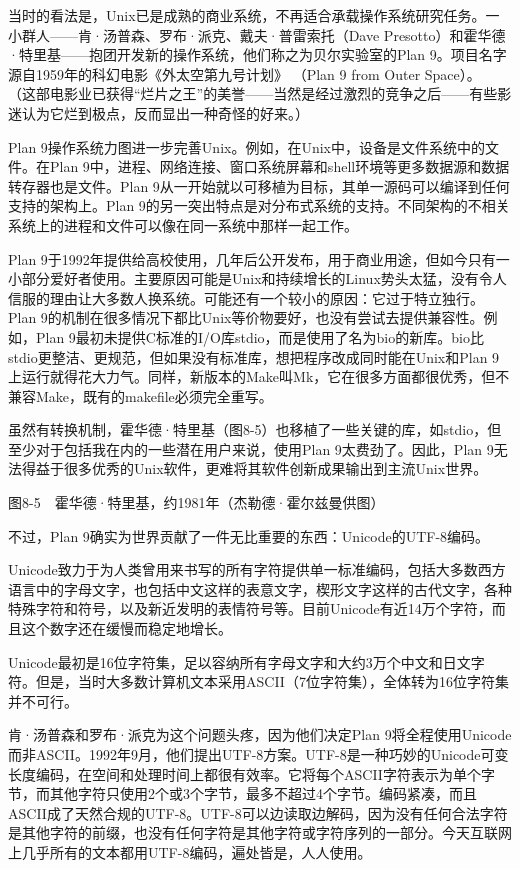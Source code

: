 \documentclass[a4paper,12pt,UTF8,twoside]{ctexbook}
\begin{document}
当时的看法是，Unix已是成熟的商业系统，不再适合承载操作系统研究任务。一小群人——肯·汤普森、罗布·派克、戴夫·普雷索托（Dave Presotto）和霍华德·特里基——抱团开发新的操作系统，他们称之为贝尔实验室的Plan 9。项目名字源自1959年的科幻电影《外太空第九号计划》 （Plan 9 from Outer Space）。 （这部电影业已获得“烂片之王”的美誉——当然是经过激烈的竞争之后——有些影迷认为它烂到极点，反而显出一种奇怪的好来。）

Plan 9操作系统力图进一步完善Unix。例如，在Unix中，设备是文件系统中的文件。在Plan 9中，进程、网络连接、窗口系统屏幕和shell环境等更多数据源和数据转存器也是文件。Plan 9从一开始就以可移植为目标，其单一源码可以编译到任何支持的架构上。Plan 9的另一突出特点是对分布式系统的支持。不同架构的不相关系统上的进程和文件可以像在同一系统中那样一起工作。

Plan 9于1992年提供给高校使用，几年后公开发布，用于商业用途，但如今只有一小部分爱好者使用。主要原因可能是Unix和持续增长的Linux势头太猛，没有令人信服的理由让大多数人换系统。可能还有一个较小的原因：它过于特立独行。Plan 9的机制在很多情况下都比Unix等价物要好，也没有尝试去提供兼容性。例如，Plan 9最初未提供C标准的I/O库stdio，而是使用了名为bio的新库。bio比stdio更整洁、更规范，但如果没有标准库，想把程序改成同时能在Unix和Plan 9上运行就得花大力气。同样，新版本的Make叫Mk，它在很多方面都很优秀，但不兼容Make，既有的makefile必须完全重写。

虽然有转换机制，霍华德·特里基（图8-5）也移植了一些关键的库，如stdio，但至少对于包括我在内的一些潜在用户来说，使用Plan 9太费劲了。因此，Plan 9无法得益于很多优秀的Unix软件，更难将其软件创新成果输出到主流Unix世界。



图8-5　霍华德·特里基，约1981年（杰勒德·霍尔兹曼供图）

不过，Plan 9确实为世界贡献了一件无比重要的东西：Unicode的UTF-8编码。

Unicode致力于为人类曾用来书写的所有字符提供单一标准编码，包括大多数西方语言中的字母文字，也包括中文这样的表意文字，楔形文字这样的古代文字，各种特殊字符和符号，以及新近发明的表情符号等。目前Unicode有近14万个字符，而且这个数字还在缓慢而稳定地增长。

Unicode最初是16位字符集，足以容纳所有字母文字和大约3万个中文和日文字符。但是，当时大多数计算机文本采用ASCII（7位字符集），全体转为16位字符集并不可行。

肯·汤普森和罗布·派克为这个问题头疼，因为他们决定Plan 9将全程使用Unicode而非ASCII。1992年9月，他们提出UTF-8方案。UTF-8是一种巧妙的Unicode可变长度编码，在空间和处理时间上都很有效率。它将每个ASCII字符表示为单个字节，而其他字符只使用2个或3个字节，最多不超过4个字节。编码紧凑，而且ASCII成了天然合规的UTF-8。UTF-8可以边读取边解码，因为没有任何合法字符是其他字符的前缀，也没有任何字符是其他字符或字符序列的一部分。今天互联网上几乎所有的文本都用UTF-8编码，遍处皆是，人人使用。
\end{document}
